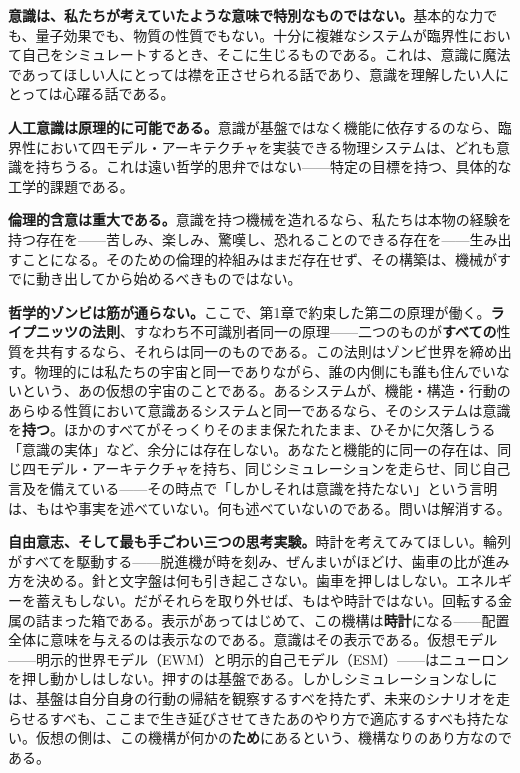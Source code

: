 \documentclass[11pt, twoside, openright]{book}
\begin{document}
\textbf{意識は、私たちが考えていたような意味で特別なものではない。}基本的な力でも、量子効果でも、物質の性質でもない。十分に複雑なシステムが臨界性において自己をシミュレートするとき、そこに生じるものである。これは、意識に魔法であってほしい人にとっては襟を正させられる話であり、意識を理解したい人にとっては心躍る話である。

\textbf{人工意識は原理的に可能である。}意識が基盤ではなく機能に依存するのなら、臨界性において四モデル・アーキテクチャを実装できる物理システムは、どれも意識を持ちうる。これは遠い哲学的思弁ではない------特定の目標を持つ、具体的な工学的課題である。

\textbf{倫理的含意は重大である。}意識を持つ機械を造れるなら、私たちは本物の経験を持つ存在を------苦しみ、楽しみ、驚嘆し、恐れることのできる存在を------生み出すことになる。そのための倫理的枠組みはまだ存在せず、その構築は、機械がすでに動き出してから始めるべきものではない。

\textbf{哲学的ゾンビは筋が通らない。}ここで、第1章で約束した第二の原理が働く。\textbf{ライプニッツの法則}、すなわち不可識別者同一の原理------二つのものが\textbf{すべての}性質を共有するなら、それらは同一のものである。この法則はゾンビ世界を締め出す。物理的には私たちの宇宙と同一でありながら、誰の内側にも誰も住んでいないという、あの仮想の宇宙のことである。あるシステムが、機能・構造・行動のあらゆる性質において意識あるシステムと同一であるなら、そのシステムは意識を\textbf{持つ}。ほかのすべてがそっくりそのまま保たれたまま、ひそかに欠落しうる「意識の実体」など、余分には存在しない。あなたと機能的に同一の存在は、同じ四モデル・アーキテクチャを持ち、同じシミュレーションを走らせ、同じ自己言及を備えている------その時点で「しかしそれは意識を持たない」という言明は、もはや事実を述べていない。何も述べていないのである。問いは解消する。

\textbf{自由意志、そして最も手ごわい三つの思考実験。}時計を考えてみてほしい。輪列がすべてを駆動する------脱進機が時を刻み、ぜんまいがほどけ、歯車の比が進み方を決める。針と文字盤は何も引き起こさない。歯車を押しはしない。エネルギーを蓄えもしない。だがそれらを取り外せば、もはや時計ではない。回転する金属の詰まった箱である。表示があってはじめて、この機構は\textbf{時計}になる------配置全体に意味を与えるのは表示なのである。意識はその表示である。仮想モデル------明示的世界モデル（EWM）と明示的自己モデル（ESM）------はニューロンを押し動かしはしない。押すのは基盤である。しかしシミュレーションなしには、基盤は自分自身の行動の帰結を観察するすべを持たず、未来のシナリオを走らせるすべも、ここまで生き延びさせてきたあのやり方で適応するすべも持たない。仮想の側は、この機構が何かの\textbf{ため}にあるという、機構なりのあり方なのである。
\end{document}
